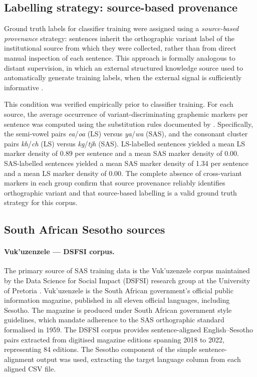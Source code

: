 \documentclass[11pt,a4paper]{article}
\begin{document}
\subsection{Labelling strategy: source-based provenance}

Ground truth labels for classifier training were assigned using a
\textit{source-based provenance} strategy: sentences inherit the orthographic
variant label of the institutional source from which they were collected, rather
than from direct manual inspection of each sentence. This approach is formally analogous to distant supervision, in which an external structured knowledge source used to automatically generate training labels, when the external signal is sufficiently informative \citep{quirk-poon-2017-distant}.

This condition was verified empirically prior to classifier training. For each
source, the average occurrence of variant-discriminating graphemic markers
per sentence was computed using the substitution rules documented by
\citet{makutoane2022people}. Specifically, the semi-vowel pairs
\textit{ea}/\textit{oa} (LS) versus \textit{ya}/\textit{wa} (SAS), and
the consonant cluster pairs \textit{kh}/\textit{ch} (LS) versus
\textit{kg}/\textit{tjh} (SAS). LS-labelled sentences yielded a mean LS
marker density of 0.89 per sentence and a mean SAS marker density of 0.00.
SAS-labelled sentences yielded a mean SAS marker density of 1.34 per sentence
and a mean LS marker density of 0.00. The complete absence of cross-variant
markers in each group confirm that source provenance reliably identifies
orthographic variant and that source-based labelling is a valid ground truth
strategy for this corpus.

\subsection{South African Sesotho sources}

\paragraph{Vuk'uzenzele — DSFSI corpus.}
The primary source of SAS training data is the Vuk'uzenzele corpus maintained
by the Data Science for Social Impact (DSFSI) research group at the University
of Pretoria \citep{marivate2020investigating}. Vuk'uzenzele is the South African
government's official public information magazine, published in all eleven
official languages, including Sesotho. The magazine is produced under South
African government style guidelines, which mandate adherence to the SAS
orthographic standard formalised in 1959. The DSFSI corpus provides
sentence-aligned English--Sesotho pairs extracted from digitised magazine
editions spanning 2018 to 2022, representing 84 editions. The Sesotho component
of the simple sentence-alignment output was used, extracting the target language
column from each aligned CSV file.
\end{document}
